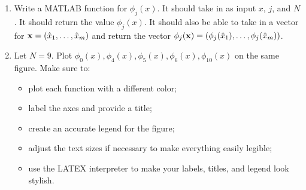 \begin{enumerate}
\item Write a MATLAB function for $\phi_j(x)$.  It should take in as input $x$, $j$, and $N$.  It should return the value $\phi_j(x)$.  It should also be able to take in a vector for ${\bf x}=(\hat{x}_1,\ldots,\hat{x}_m)$ and return the vector $\phi_j({\bf x})=(\phi_j(\hat{x}_1),\ldots,\phi_j(\hat{x}_m))$.
\\
\item Let $N=9$.  Plot $\phi_0(x),\phi_4(x), \phi_5(x),\phi_6(x), \phi_{10}(x)$ on the same figure.  Make sure to:
\begin{itemize}
\item plot each function with a different color;
\item label the axes and provide a title;
\item create an accurate legend for the figure;
\item adjust the text sizes if necessary to make everything easily legible;
\item use the LATEX interpreter to make your labels, titles, and legend look stylish.
\end{itemize}
\end{enumerate}




